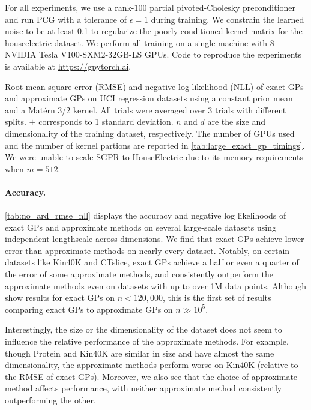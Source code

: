 For all experiments, we use a rank-$100$ partial pivoted-Cholesky preconditioner and
run PCG with a tolerance of $\epsilon = 1$ during training.
We constrain the learned noise to be at least 0.1 to regularize the poorly
conditioned kernel matrix for the houseelectric dataset.
We perform all training on a single machine with 8 NVIDIA Tesla V100-SXM2-32GB-LS GPUs.
Code to reproduce the experiments is available at \url{https://gpytorch.ai}.
\begin{table}[h!]
  \caption{
	  Root-mean-square-error (RMSE) and negative log-likelihood (NLL) of exact GPs and approximate GPs on UCI regression datasets using a constant prior mean and a Mat\'ern 3/2 kernel. All trials were averaged over 3 trials with different splits.  $\pm$ corresponds to 1 standard deviation.
    $n$ and $d$ are the size and dimensionality of the training dataset,
    respectively. The number of GPUs used and the number of kernel partions are reported in \autoref{tab:large_exact_gp_timings}.
    We were unable to scale SGPR to HouseElectric due to its memory requirements when $m=512$.
    \vspace{0.3em}
  }
  \label{tab:no_ard_rmse_nll}
  \centering
  \resizebox{\textwidth}{!}{%
    
  }
\end{table}

\paragraph{Accuracy.}
\autoref{tab:no_ard_rmse_nll} displays the accuracy and negative log likelihoods of exact GPs and approximate methods on several large-scale datasets using independent lengthscale across dimensions.
We find that exact GPs achieve lower error than approximate methods on nearly every dataset. Notably, on certain datasets
like Kin40K and CTslice, exact GPs achieve a half or even a quarter of the error of some approximate methods, and consistently outperform
the approximate methods even on datasets with up to over 1M data points.
Although \citet{nguyen2019exact} show results for exact GPs on $n < 120,\!000$, this is the first set of results comparing exact GPs to approximate GPs on $n\gg 10^5$.

Interestingly, the size or the dimensionality of the dataset does not seem to influence the relative performance of the approximate methods.
For example, though Protein and Kin40K  are similar in size and have almost the same dimensionality, the approximate methods perform worse on Kin40K (relative to the RMSE of exact GPs).
Moreover, we also see that the choice of approximate method affects performance, with neither approximate method consistently outperforming the other.

